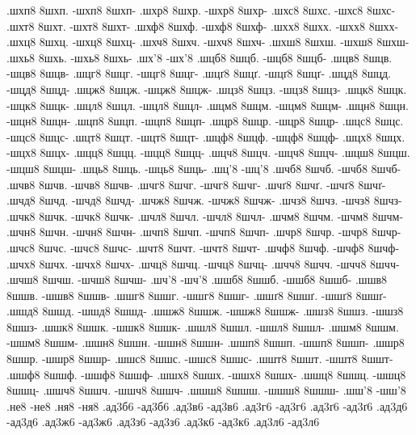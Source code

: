 {.шхп8 8шхп. -шхп8 8шхп-
.шхр8 8шхр. -шхр8 8шхр-
.шхс8 8шхс. -шхс8 8шхс-
.шхт8 8шхт. -шхт8 8шхт-
.шхф8 8шхф. -шхф8 8шхф-
.шхх8 8шхх. -шхх8 8шхх-
.шхц8 8шхц. -шхц8 8шхц-
.шхч8 8шхч. -шхч8 8шхч-
.шхш8 8шхш. -шхш8 8шхш-
.шхь8 8шхь. -шхь8 8шхь-
.шх'8 -шх'8
.шцб8 8шцб. -шцб8 8шцб-
.шцв8 8шцв. -шцв8 8шцв-
.шцг8 8шцг. -шцг8 8шцг-
.шцґ8 8шцґ. -шцґ8 8шцґ-
.шцд8 8шцд. -шцд8 8шцд-
.шцж8 8шцж. -шцж8 8шцж-
.шцз8 8шцз. -шцз8 8шцз-
.шцк8 8шцк. -шцк8 8шцк-
.шцл8 8шцл. -шцл8 8шцл-
.шцм8 8шцм. -шцм8 8шцм-
.шцн8 8шцн. -шцн8 8шцн-
.шцп8 8шцп. -шцп8 8шцп-
.шцр8 8шцр. -шцр8 8шцр-
.шцс8 8шцс. -шцс8 8шцс-
.шцт8 8шцт. -шцт8 8шцт-
.шцф8 8шцф. -шцф8 8шцф-
.шцх8 8шцх. -шцх8 8шцх-
.шцц8 8шцц. -шцц8 8шцц-
.шцч8 8шцч. -шцч8 8шцч-
.шцш8 8шцш. -шцш8 8шцш-
.шць8 8шць. -шць8 8шць-
.шц'8 -шц'8
.шчб8 8шчб. -шчб8 8шчб-
.шчв8 8шчв. -шчв8 8шчв-
.шчг8 8шчг. -шчг8 8шчг-
.шчґ8 8шчґ. -шчґ8 8шчґ-
.шчд8 8шчд. -шчд8 8шчд-
.шчж8 8шчж. -шчж8 8шчж-
.шчз8 8шчз. -шчз8 8шчз-
.шчк8 8шчк. -шчк8 8шчк-
.шчл8 8шчл. -шчл8 8шчл-
.шчм8 8шчм. -шчм8 8шчм-
.шчн8 8шчн. -шчн8 8шчн-
.шчп8 8шчп. -шчп8 8шчп-
.шчр8 8шчр. -шчр8 8шчр-
.шчс8 8шчс. -шчс8 8шчс-
.шчт8 8шчт. -шчт8 8шчт-
.шчф8 8шчф. -шчф8 8шчф-
.шчх8 8шчх. -шчх8 8шчх-
.шчц8 8шчц. -шчц8 8шчц-
.шчч8 8шчч. -шчч8 8шчч-
.шчш8 8шчш. -шчш8 8шчш-
.шч'8 -шч'8
.шшб8 8шшб. -шшб8 8шшб-
.шшв8 8шшв. -шшв8 8шшв-
.шшг8 8шшг. -шшг8 8шшг-
.шшґ8 8шшґ. -шшґ8 8шшґ-
.шшд8 8шшд. -шшд8 8шшд-
.шшж8 8шшж. -шшж8 8шшж-
.шшз8 8шшз. -шшз8 8шшз-
.шшк8 8шшк. -шшк8 8шшк-
.шшл8 8шшл. -шшл8 8шшл-
.шшм8 8шшм. -шшм8 8шшм-
.шшн8 8шшн. -шшн8 8шшн-
.шшп8 8шшп. -шшп8 8шшп-
.шшр8 8шшр. -шшр8 8шшр-
.шшс8 8шшс. -шшс8 8шшс-
.шшт8 8шшт. -шшт8 8шшт-
.шшф8 8шшф. -шшф8 8шшф-
.шшх8 8шшх. -шшх8 8шшх-
.шшц8 8шшц. -шшц8 8шшц-
.шшч8 8шшч. -шшч8 8шшч-
.шшш8 8шшш. -шшш8 8шшш-
.шш'8 -шш'8
%
%
%
.не8 -не8
.ня8 -ня8
%
%
%
.ад3б6 -ад3б6
.ад3в6 -ад3в6
.ад3г6 -ад3г6
.ад3ґ6 -ад3ґ6
.ад3д6 -ад3д6
.ад3ж6 -ад3ж6
.ад3з6 -ад3з6
.ад3к6 -ад3к6
.ад3л6 -ад3л6
}
